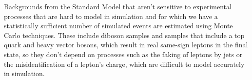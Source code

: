 
Backgrounds from the Standard Model that aren't sensitive to experimental processes that are hard to model in simulation and for which we have a statistically sufficient number of simulated events are estimated using Monte Carlo techniques.
These include diboson samples and samples that include a top quark and heavy vector bosons, which result in real same-sign leptons in the final state, so they don't depend on processes such as the faking of leptons by jets or the misidentification of a lepton's charge, which are difficult to model accurately in simulation.



